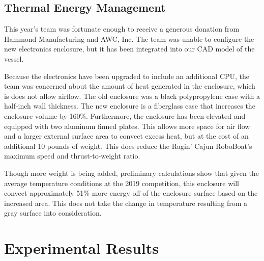 \documentclass[letterpaper, 12 pt, conference]{ieeeconf}
\begin{document}
\subsection{Thermal Energy Management}
This year's team was fortunate enough to receive a generous donation from Hammond Manufacturing and AWC, Inc. The team was unable to configure the new electronics enclosure, but it has been integrated into our CAD model of the vessel.

Because the electronics have been upgraded to include an additional CPU, the team was concerned about the amount of heat generated in the enclosure, which is does not allow airflow. The old enclosure was a black polypropylene case with a half-inch wall thickness. The new enclosure is a fiberglass case that increases the enclosure volume by 160\%. Furthermore, the enclosure has been elevated and equipped with two aluminum finned plates. This allows more space for air flow and a larger external surface area to convect excess heat, but at the cost of an additional 10 pounds of weight. This does reduce the Ragin' Cajun RoboBoat's maximum speed and thrust-to-weight ratio. 

Though more weight is being added, preliminary calculations show that given the average temperature conditions at the 2019 competition, this enclosure will convect approximately 51\% more energy off of the enclosure surface based on the increased area. This does not take the change in temperature resulting from a gray surface into consideration.

\section{Experimental Results}
\end{document}
